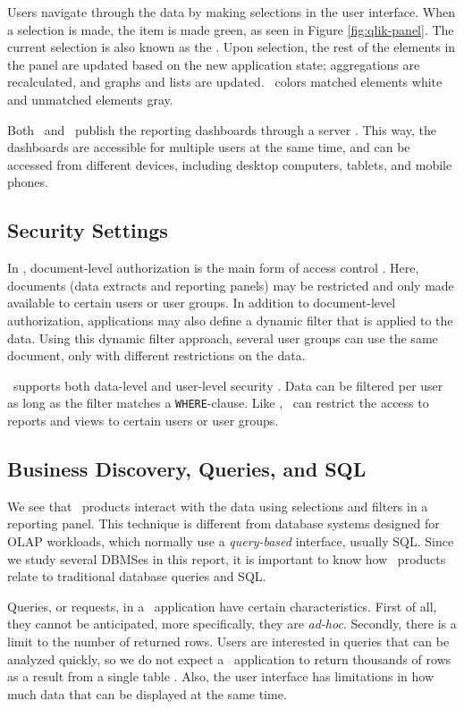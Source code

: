 Users navigate through the data by making selections in the user interface. When a selection is made, the item is made green, as seen in Figure \ref{fig:qlik-panel}. The current selection is also known as the . Upon selection, the rest of the elements in the panel are updated based on the new application state; aggregations are recalculated, and graphs and lists are updated. \qlikview~colors matched elements white and unmatched elements gray.

Both \qlikview~and \tableau~publish the reporting dashboards through a server \cite{Kamkolkar2015-iq, Qlik2011-ef}. This way, the dashboards are accessible for multiple users at the same time, and can be accessed from different devices, including desktop computers, tablets, and mobile phones.

\subsection{Security Settings}
\label{sub:Security Settings}
In \qlikview, document-level authorization is the main form of access control \cite{Qlik2011-hj}. Here, documents (data extracts and reporting panels) may be restricted and only made available to certain users or user groups. In addition to document-level authorization, applications may also define a dynamic filter that is applied to the data. Using this dynamic filter approach, several user groups can use the same document, only with different restrictions on the data.

\tableau~supports both data-level and user-level security \cite{Kamkolkar2015-iq}. Data can be filtered per user as long as the filter matches a \texttt{WHERE}-clause. Like \qlikview, \tableau~can restrict the access to reports and views to certain users or user groups.

\subsection{Business Discovery, Queries, and SQL}
\label{sub:Business Discovery, Queries, and SQL}
We see that \bd~products interact with the data using selections and filters in a reporting panel. This technique is different from database systems designed for OLAP workloads, which normally use a \textit{query-based} interface, usually SQL. Since we study several DBMSes in this report, it is important to know how \bd~products relate to traditional database queries and SQL.

Queries, or requests, in a \bd~application have certain characteristics. First of all, they cannot be anticipated, more specifically, they are \textit{ad-hoc}. Secondly, there is a limit to the number of returned rows. Users are interested in queries that can be analyzed quickly, so we do not expect a \bd~application to return thousands of rows as a result from a single table \cite{Ferrari2012-hm}. Also, the user interface has limitations in how much data that can be displayed at the same time. 

